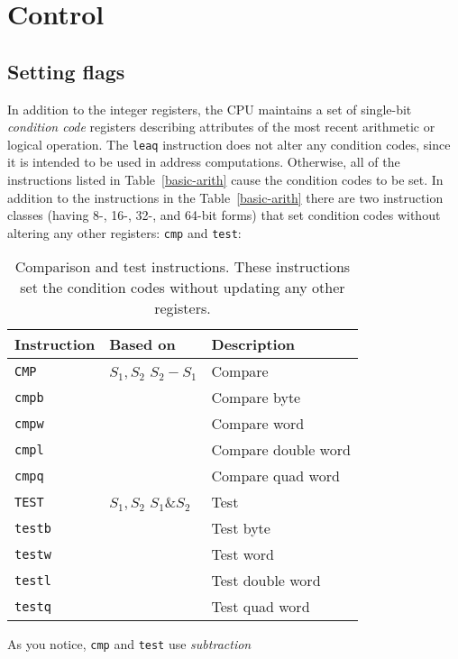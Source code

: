 \section{Control}
\subsection{Setting flags}
In addition to the integer registers, the CPU maintains a set of single-bit 
\textit{condition code} registers describing attributes of the most recent arithmetic 
or logical operation.
The \texttt{leaq} instruction does not alter any condition codes, since it 
is intended to be used in address computations. Otherwise, all of the instructions 
listed in Table~\ref{basic-arith} cause the condition codes to be set.
In addition to the instructions in the Table~\ref{basic-arith} there are 
two instruction classes (having 8-, 16-, 32-, and 64-bit forms) that set 
condition codes without altering any other registers: \texttt{cmp} and \texttt{test}:
\begin{table}[h]
    \centering
    \begin{tabular}{lll}
        \toprule
        \textbf{Instruction} & \textbf{Based on} & \textbf{Description} \\
        \midrule
        \texttt{CMP}  & $S_1, S_2$ \quad $S_2 - S_1$ & Compare \\
        \quad \texttt{cmpb} & & Compare byte \\
        \quad \texttt{cmpw} & & Compare word \\
        \quad \texttt{cmpl} & & Compare double word \\
        \quad \texttt{cmpq} & & Compare quad word \\
        \midrule
        \texttt{TEST} & $S_1, S_2$ \quad $S_1 \& S_2$ & Test \\
        \quad \texttt{testb} & & Test byte \\
        \quad \texttt{testw} & & Test word \\
        \quad \texttt{testl} & & Test double word \\
        \quad \texttt{testq} & & Test quad word \\
        \bottomrule
    \end{tabular}
    \caption{Comparison and test instructions. These instructions set the 
    condition codes without updating any other registers.}
    \label{tab:cmp_test_instructions}
\end{table}
%
As you notice, \texttt{cmp} and \texttt{test} use \textit{subtraction} 

